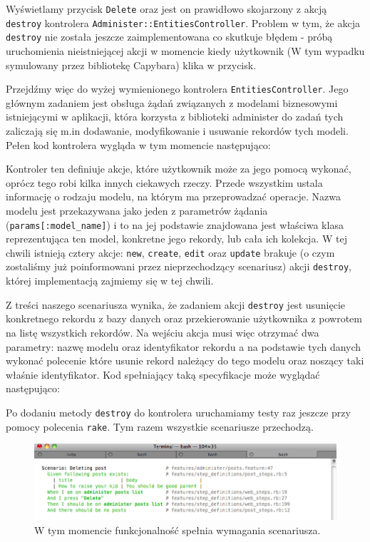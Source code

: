   Wyświetlamy przycisk \verb+Delete+ oraz jest on prawidłowo skojarzony z akcją \verb+destroy+ kontrolera \verb+Administer::EntitiesController+. Problem w tym, że akcja \verb+destroy+ nie została jeszcze zaimplementowana co skutkuje błędem - próbą uruchomienia nieistniejącej akcji w momencie kiedy użytkownik (W tym wypadku symulowany przez bibliotekę Capybara) klika w przycisk.
  
  Przejdźmy więc do wyżej wymienionego kontrolera \verb+EntitiesController+. Jego głównym zadaniem jest obsługa żądań związanych z modelami biznesowymi istniejącymi w aplikacji, która korzysta z biblioteki administer do zadań tych zaliczają się m.in dodawanie, modyfikowanie i usuwanie rekordów tych modeli. Pełen kod kontrolera wygląda w tym momencie następująco:
  
  
  
  Kontroler ten definiuje akcje, które użytkownik może za jego pomocą wykonać, oprócz tego robi kilka innych ciekawych rzeczy. Przede wszystkim ustala informację o rodzaju modelu, na którym ma przeprowadzać operacje. Nazwa modelu jest przekazywana jako jeden z parametrów żądania (\verb+params[:model_name]+) i to na jej podstawie znajdowana jest właściwa klasa reprezentująca ten model, konkretne jego rekordy, lub cała ich kolekcja.
  W tej chwili istnieją cztery akcje: \verb+new+, \verb+create+, \verb+edit+ oraz \verb+update+ brakuje (o czym zostaliśmy już poinformowani przez nieprzechodzący scenariusz) akcji \verb+destroy+, której implementacją zajmiemy się w tej chwili.
  
  Z treści naszego scenariusza wynika, że zadaniem akcji \verb+destroy+ jest usunięcie konkretnego rekordu z bazy danych oraz przekierowanie użytkownika z powrotem na listę wszystkich rekordów. Na wejściu akcja musi więc otrzymać dwa parametry: nazwę modelu oraz identyfikator rekordu a na podstawie tych danych wykonać polecenie które usunie rekord należący do tego modelu oraz noszący taki właśnie identyfikator. Kod spełniający taką specyfikacje może wyglądać następująco: 
  
  
  
  Po dodaniu metody \verb+destroy+ do kontrolera uruchamiamy testy raz jeszcze przy pomocy polecenia \verb+rake+. Tym razem wszystkie scenariusze przechodzą.
  
  \clearpage
  
   \begin{figure}[!h]
 		\begin{center}
 			\includegraphics[width=\linewidth]{images/delete_record_scenario_pass.png}
 			\caption{W tym momencie funkcjonalność spełnia wymagania scenariusza.}
 			\label{delete_record_scenario_pass}
 		\end{center}
 	\end{figure}
 	
